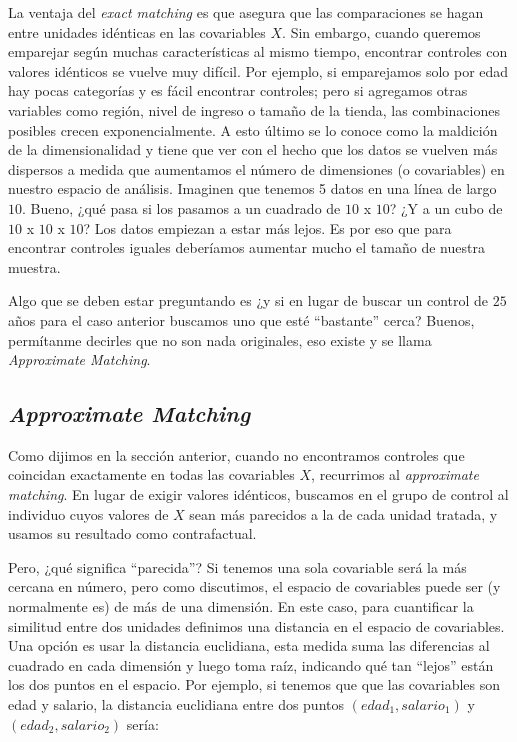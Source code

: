 \documentclass[
  letterpaper,
  DIV=11,
  numbers=noendperiod,
  oneside]{scrreprt}
\begin{document}
La ventaja del \emph{exact matching} es que asegura que las
comparaciones se hagan entre unidades idénticas en las covariables
\(X\). Sin embargo, cuando queremos emparejar según muchas
características al mismo tiempo, encontrar controles con valores
idénticos se vuelve muy difícil. Por ejemplo, si emparejamos solo por
edad hay pocas categorías y es fácil encontrar controles; pero si
agregamos otras variables como región, nivel de ingreso o tamaño de la
tienda, las combinaciones posibles crecen exponencialmente. A esto
último se lo conoce como la maldición de la dimensionalidad y tiene que
ver con el hecho que los datos se vuelven más dispersos a medida que
aumentamos el número de dimensiones (o covariables) en nuestro espacio
de análisis. Imaginen que tenemos 5 datos en una línea de largo \(10\).
Bueno, ¿qué pasa si los pasamos a un cuadrado de \(10\) x \(10\)? ¿Y a
un cubo de \(10\) x \(10\) x \(10\)? Los datos empiezan a estar más
lejos. Es por eso que para encontrar controles iguales deberíamos
aumentar mucho el tamaño de nuestra muestra.

Algo que se deben estar preguntando es ¿y si en lugar de buscar un
control de \(25\) años para el caso anterior buscamos uno que esté
``bastante'' cerca? Buenos, permítanme decirles que no son nada
originales, eso existe y se llama \emph{Approximate Matching}.

\hypertarget{approximate-matching}{%
\subsection{\texorpdfstring{\emph{Approximate
Matching}}{Approximate Matching}}\label{approximate-matching}}

Como dijimos en la sección anterior, cuando no encontramos controles que
coincidan exactamente en todas las covariables \(X\), recurrimos al
\emph{approximate matching}. En lugar de exigir valores idénticos,
buscamos en el grupo de control al individuo cuyos valores de \(X\) sean
más parecidos a la de cada unidad tratada, y usamos su resultado como
contrafactual.

Pero, ¿qué significa ``parecida''? Si tenemos una sola covariable será
la más cercana en número, pero como discutimos, el espacio de
covariables puede ser (y normalmente es) de más de una dimensión. En
este caso, para cuantificar la similitud entre dos unidades definimos
una distancia en el espacio de covariables. Una opción es usar la
distancia euclidiana, esta medida suma las diferencias al cuadrado en
cada dimensión y luego toma raíz, indicando qué tan ``lejos'' están los
dos puntos en el espacio. Por ejemplo,
si tenemos que que las covariables son edad y salario, la distancia
euclidiana entre dos puntos \((edad_1, salario_1)\) y
\((edad_2, salario_2)\) sería:
\end{document}
